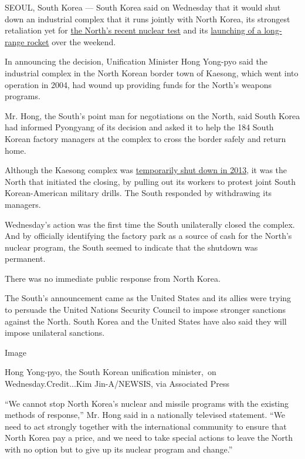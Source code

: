 SEOUL, South Korea --- South Korea said on Wednesday that it would shut
down an industrial complex that it runs jointly with North Korea, its
strongest retaliation yet for
\href{http://www.nytimes.com/2016/01/07/world/asia/north-korea-hydrogen-bomb-q-a.html}{the
North's recent nuclear test} and its
\href{http://www.nytimes.com/2016/02/07/world/asia/north-korea-moves-up-rocket-launching-plan.html}{launching
of a long-range rocket} over the weekend.

In announcing the decision, Unification Minister Hong Yong-pyo said the
industrial complex in the North Korean border town of Kaesong, which
went into operation in 2004, had wound up providing funds for the
North's weapons programs.

Mr. Hong, the South's point man for negotiations on the North, said
South Korea had informed Pyongyang of its decision and asked it to help
the 184 South Korean factory managers at the complex to cross the border
safely and return home.

Although the Kaesong complex was
\href{http://www.nytimes.com/2013/04/09/world/asia/north-korea.html}{temporarily
shut down in 2013}, it was the North that initiated the closing, by
pulling out its workers to protest joint South Korean-American military
drills. The South responded by withdrawing its managers.

Wednesday's action was the first time the South unilaterally closed the
complex. And by officially identifying the factory park as a source of
cash for the North's nuclear program, the South seemed to indicate that
the shutdown was permanent.

There was no immediate public response from North Korea.

The South's announcement came as the United States and its allies were
trying to persuade the United Nations Security Council to impose
stronger sanctions against the North. South Korea and the United States
have also said they will impose unilateral sanctions.

Image

Hong Yong-pyo, the South Korean unification minister,~on
Wednesday.Credit...Kim Jin-A/NEWSIS, via Associated Press

``We cannot stop North Korea's nuclear and missile programs with the
existing methods of response,'' Mr. Hong said in a nationally televised
statement. ``We need to act strongly together with the international
community to ensure that North Korea pay a price, and we need to take
special actions to leave the North with no option but to give up its
nuclear program and change.''

